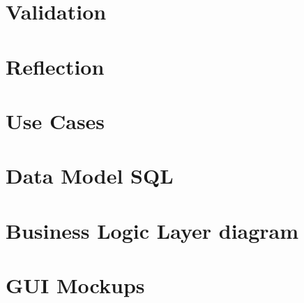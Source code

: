 \documentclass{report}
\begin{document}
\chapter{Validation}


\chapter{Reflection}


\appendix

\chapter{Use Cases}


\chapter{Data Model SQL}


\chapter{Business Logic Layer diagram}


\chapter{GUI Mockups}

\end{document}
